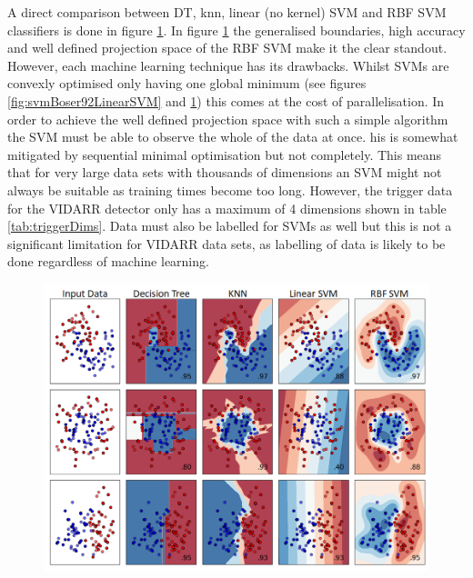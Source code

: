 A direct comparison between DT, knn, linear (no kernel) SVM and RBF SVM classifiers is done in figure \ref{fig:sklearnReleventExamples}. In figure \ref{fig:sklearnReleventExamples} the generalised boundaries, high accuracy and well defined projection space of the RBF SVM make it the clear standout. However, each machine learning technique has its drawbacks. Whilst SVMs are convexly optimised only having one global minimum \cite{Boser92atraining} (see figures \ref{fig:svmBoser92LinearSVM} and \ref{fig:sklearnReleventExamples}) this comes at the cost of parallelisation. In order to achieve the well defined projection space with such a simple algorithm the SVM must be able to observe the whole of the data at once. his is somewhat mitigated by sequential minimal optimisation \cite{platt1998sequential} but not completely. This means that for very large data sets with thousands of dimensions an SVM might not always be suitable as training times become too long. However, the trigger data for the VIDARR detector only has a maximum of 4 dimensions shown in table \ref{tab:triggerDims}. Data must also be labelled for SVMs as well but this is not a significant limitation for VIDARR data sets, as labelling of data is likely to be done regardless of machine learning.
 
\begin{figure}[!h]
\centering
\includegraphics[width=0.9\linewidth]{Chapter4/Figs/Raster/svmLinAndRbf/sklearnReleventExamplesMedText.png}
\label{fig:sklearnReleventExamples}
\end{figure}

